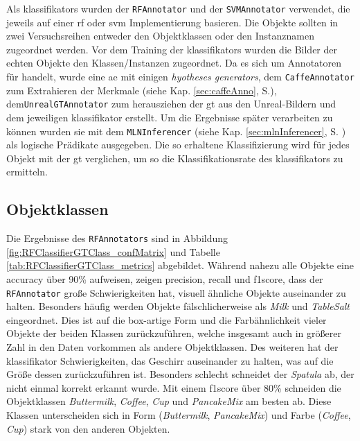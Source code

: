 Als \glspl{klassifikator} wurden der \texttt{RFAnnotator} und der \texttt{SVMAnnotator} verwendet, die jeweils auf einer \gls{rf} oder \gls{svm} Implementierung basieren. Die Objekte sollten in zwei Versuchsreihen entweder den Objektklassen oder den Instanznamen zugeordnet werden. Vor dem Training der \glspl{klassifikator} wurden die Bilder der echten Objekte den Klassen/Instanzen zugeordnet. Da es sich um Annotatoren für \robosherlock handelt, wurde eine \gls{ae} mit einigen \textit{hyotheses generators}, dem \texttt{CaffeAnnotator} zum Extrahieren der Merkmale (siehe Kap. \ref{sec:caffeAnno}, S.\pageref{sec:caffeAnno}), dem\linebreak \texttt{UnrealGTAnnotator} zum herausziehen der \gls{gt} aus den Unreal-Bildern und dem jeweiligen \gls{klassifikator} erstellt. Um die Ergebnisse später verarbeiten zu können wurden sie mit dem \texttt{MLNInferencer} (siehe Kap. \ref{sec:mlnInferencer}, S. \pageref{sec:mlnInferencer}) als logische Prädikate ausgegeben. Die so erhaltene Klassifizierung wird für jedes Objekt mit der \gls{gt} verglichen, um so die Klassifikationsrate des \gls{klassifikator}s zu ermitteln.

\subsection{Objektklassen}
Die Ergebnisse des \texttt{RFAnnotators} sind in Abbildung \ref{fig:RFClassifierGTClass_confMatrix} und Tabelle \ref{tab:RFClassifierGTClass_metrics} abgebildet. Während nahezu alle Objekte eine \gls{accuracy} über 90\% aufweisen, zeigen \gls{precision}, \gls{recall} und \gls{f1score}, dass der \texttt{RFAnnotator} große Schwierigkeiten hat, visuell ähnliche Objekte auseinander zu halten. Besonders häufig werden Objekte fälschlicherweise als \textit{Milk} und \textit{TableSalt} eingeordnet. Dies ist auf die box-artige Form und die Farbähnlichkeit vieler Objekte der beiden Klassen zurückzuführen, welche insgesamt auch in größerer Zahl in den Daten vorkommen als andere Objektklassen. Des weiteren hat der \gls{klassifikator} Schwierigkeiten, das Geschirr auseinander zu halten, was auf die Größe dessen zurückzuführen ist. Besonders schlecht schneidet der \textit{Spatula} ab, der nicht einmal korrekt erkannt wurde. Mit einem \gls{f1score} über 80\% schneiden die Objektklassen \textit{Buttermilk}, \textit{Coffee}, \textit{Cup} und \textit{PancakeMix} am besten ab. Diese Klassen unterscheiden sich in Form (\textit{Buttermilk}, \textit{PancakeMix}) und Farbe (\textit{Coffee}, \textit{Cup}) stark von den anderen Objekten.  \par

